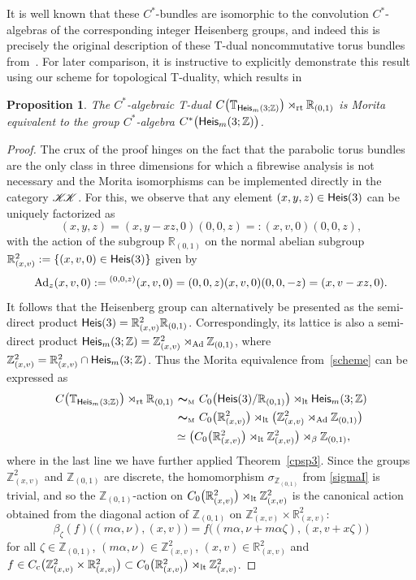 \documentclass[10pt,a4paper]{amsart}
\numberwithin{equation}{section}
\def\nn{\nonumber}
\newcommand{\Z}{\zed}
\newcommand{\mbf}[1]{{\boldsymbol {#1} }}
\newcommand{\CCK}{\mathscr{K}}
\newcommand{\Heis}{{\sf Heis}}
\newcommand{\lt}{{\rm lt}}
\newcommand{\rt}{{\rm rt}}
\newcommand{\zed}{{\mathbb Z}} %
\newcommand{\real}{{\mathbb R}} %
\newcommand{\torus}{{\mathbb T}} %
\def\nn{\nonumber}
\newtheorem{Proposition}[Theorem]{Proposition}
 { \theoremstyle{definition}
\newtheorem{Definition}[Theorem]{Definition}
\newtheorem{Note}[Theorem]{Note}
\newtheorem{Example}[Theorem]{Example}
\newtheorem{Remark}[Theorem]{Remark} }
\begin{document}
It is well known that these $C^*$-bundles are isomorphic to the
convolution $C^*$-algebras of the corresponding integer Heisenberg
groups, and indeed this is precisely the original description of these T-dual
noncommutative torus bundles from~\cite{Mathai2004}. For later
comparison, it is instructive to explicitly demonstrate this result using our
scheme for topological T-duality, which results in
\begin{Proposition}\label{prop:C*Heis}
The $C^*$-algebraic T-dual
$C\big(\torus_{\Heis_m(3;\Z)}\big)\rtimes_\rt\real_{(0,1)}$ is Morita equivalent to
the group $C^*$-algebra $C^*\big(\Heis_m(3;\Z)\big)$.
\end{Proposition}
\begin{proof}
The crux of the proof hinges on the fact that the parabolic torus
bundles are the only class in three dimensions for which a fibrewise
analysis is not necessary and the Morita isomorphisms can be
implemented directly in the category $\CCK\hspace{-1mm}\CCK$.
For this, we observe that any element $(x,y,z)\in\Heis(3)$ can
be uniquely factorized as
\[
(x,y,z) = (x,y-x z,0) (0,0,z) =: (x,v,0) (0,0,z) ,
\]
with the action of the subgroup $\real_{(0,1)}$ on the normal abelian subgroup
$\real_{(x,v)}^2:=\{(x,v,0)\in\Heis(3)\}$ given by
\[
{\rm Ad}_z(x,v,0):={}^{(0,0,z)}(x,v,0) = (0,0,z) (x,v,0) (0,0,-z) = (x,v-x z,0) .
\]
It follows that the Heisenberg group can alternatively be presented as the semi-direct
product $\Heis(3) = \real_{(x,v)}^2 \real_{(0,1)}$. Correspondingly,
its lattice is also a semi-direct product
$\Heis_m(3;\Z)=\Z_{(x,v)}^2\rtimes_{{\rm Ad}}\Z_{(0,1)}$, where
$\Z_{(x,v)}^2=\real_{(x,v)}^2\cap\Heis_m(3;\Z)$. Thus the Morita
equivalence from~\eqref{scheme} can be expressed as
\begin{align}
C\big(\torus_{\Heis_m(3;\Z)}\big)\rtimes_\rt\real_{(0,1)} & \ \mbf\sim_{\text{\tiny M}} \
C_0\big(\Heis(3)/\real_{(0,1)}\big) \rtimes_\lt \Heis_m(3;\Z) \nn\\
& \ \mbf\sim_{\text{\tiny M}} \
C_0\big(\real_{(x,v)}^2\big)\rtimes_\lt \big(\Z_{(x,v)}^2\rtimes_{{\rm
 Ad}}\Z_{(0,1)} \big) \nn\\
&\simeq
\big(C_0\big(\real_{(x,v)}^2\big)\rtimes_{\lt}
\Z_{(x,v)}^2\big) \rtimes_\beta\Z_{(0,1)} ,\label{firststep}
\end{align}
where in the last line we have further applied
Theorem~\ref{cpsp3}. Since the groups $\Z_{(x,v)}^2$ and $\Z_{(0,1)}$
are discrete, the homomorphism $\sigma_{\Z_{(0,1)}}$ from \eqref{sigmaI}
is trivial, and so the $\Z _{(0,1)}$-action on $C_0\big(\real^2_{(x,v)} \big)\rtimes_{\lt} \Z_{(x,v)}^2$ is the
canonical action obtained from the diagonal action of $\Z_{(0,1)}$ on
$\Z_{(x,v)}^2\times \real_{(x,v)}^2 $:
\[
\beta_\zeta(f)\big((m \alpha,\nu) , (x,v)\big) =
f\big((m \alpha,\nu+m \alpha \zeta) , (x,v+x \zeta)\big)
\]
for
all $\zeta\in \Z_{(0,1)}$, $(m \alpha,\nu)\in\Z_{(x,v)}^2$, $(x,v)\in \real_{(x,v)}^2 $ and
$f\in C_{\rm c}\big(\Z_{(x,v)}^2\times \real_{(x,v)}^2 \big)\subset C_0\big(\real_{(x,v)}^2 \big)\rtimes_{\lt}
\Z_{(x,v)}^2$.


\end{proof}
\end{document}

